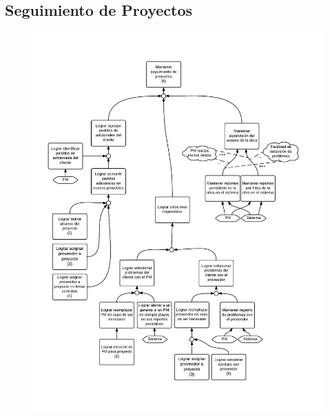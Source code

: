 \subsection{Seguimiento de Proyectos}
\begin{figure}[H]
\includegraphics[width=\textwidth, clip=true, trim=15pt 0pt 15pt 0pt]{imagenes/objetivos/objetivos14.pdf}
\end{figure}

